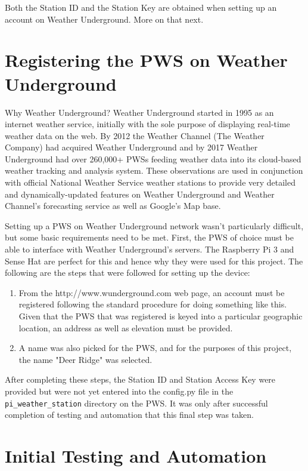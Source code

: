 \documentclass[sigconf]{acmart}
\begin{document}
Both the Station ID and the Station Key are obtained when setting up an account on Weather Underground. More on that next.

\section{Registering the PWS on Weather Underground}

Why Weather Underground? Weather Underground started in 1995 as an internet weather service, initially with the sole purpose of displaying real-time weather data on the web. By 2012 the Weather Channel (The Weather Company) had acquired Weather Underground and by 2017 Weather Underground had over 260,000+ PWSs feeding weather data into its cloud-based weather tracking and analysis system. These observations are used in conjunction with official National Weather Service weather stations to provide very detailed and dynamically-updated features on Weather Underground and Weather Channel's forecasting service as well as Google's Map base.

Setting up a PWS on Weather Underground network wasn't particularly difficult, but some basic requirements need to be met. First, the PWS of choice must be able to interface with Weather Underground's servers. The Raspberry Pi 3 and Sense Hat are perfect for this and hence why they were used for this project. The following are the steps that were followed for setting up the device:

\begin{enumerate}
    \item From the http://www.wunderground.com web page, an account must be registered following the standard procedure for doing something like this. Given that the PWS that was registered is keyed into a particular geographic location, an address as well as elevation must be provided. 
    \item A name was also picked for the PWS, and for the purposes of this project, the name "Deer Ridge" was selected.
\end{enumerate}

After completing these steps, the Station ID and Station Access Key were provided but were not yet entered into the config.py file in the \verb|pi_weather_station| directory on the PWS. It was only after successful completion of testing and automation that this final step was taken.

\section{Initial Testing and Automation}
\end{document}
